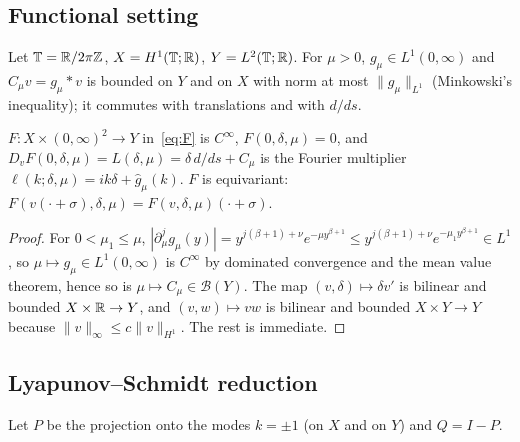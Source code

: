 \documentclass[11pt,a4paper]{report}
\providecommand{\T}{}
\renewcommand{\T}{\mathbb{T}}
\newcommand{\gh}{\hat g}
\begin{document}
\subsection{Functional setting}
Let $\T=\R/2\pi\Z$, $X=H^1(\T;\R)$, $Y=L^2(\T;\R)$. For $\mu>0$, $g_\mu\in L^1(0,\infty)$ and $C_\mu v=g_\mu*v$ is bounded on $Y$ and on $X$ with norm at most $\|g_\mu\|_{L^1}$ (Minkowski's inequality); it commutes with translations and with $d/ds$.

\begin{lemma}\label{lem:smooth}
$F:X\times(0,\infty)^2\to Y$ in~\eqref{eq:F} is $C^\infty$, $F(0,\delta,\mu)=0$, and $D_vF(0,\delta,\mu)=L(\delta,\mu)=\delta\,d/ds+C_\mu$ is the Fourier multiplier $\ell(k;\delta,\mu)=ik\delta+\gh_\mu(k)$. $F$ is equivariant: $F(v(\cdot+\sigma),\delta,\mu)=F(v,\delta,\mu)(\cdot+\sigma)$.
\end{lemma}
\begin{proof}
For $0<\mu_1\le\mu$, $|\partial_\mu^jg_\mu(y)|=y^{j(\beta+1)+\nu}e^{-\mu y^{\beta+1}}\le y^{j(\beta+1)+\nu}e^{-\mu_1y^{\beta+1}}\in L^1$, so $\mu\mapsto g_\mu\in L^1(0,\infty)$ is $C^\infty$ by dominated convergence and the mean value theorem, hence so is $\mu\mapsto C_\mu\in\mathcal B(Y)$. The map $(v,\delta)\mapsto\delta v'$ is bilinear and bounded $X\times\mathbb{R}\to Y$, and $(v,w)\mapsto vw$ is bilinear and bounded $X\times Y\to Y$ because $\|v\|_\infty\le c\|v\|_{H^1}$. The rest is immediate.
\end{proof}

\subsection{Lyapunov--Schmidt reduction}
Let $P$ be the projection onto the modes $k=\pm1$ (on $X$ and on $Y$) and $Q=I-P$.
\end{document}

